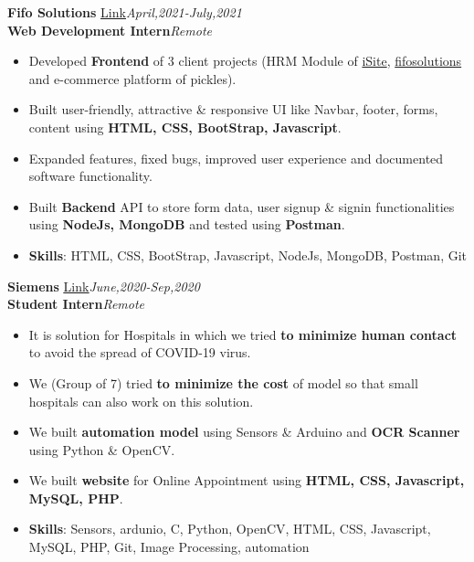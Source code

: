 \documentclass[10pt]{extarticle}
\begin{document}
\textbf{Fifo Solutions}  \href{https://github.com/PSoni8/FIFO-Solutions-Internship}{\underline{Link}}\hfill\hfill\textit{April,2021-July,2021}\\
\textbf{Web Development Intern}\hfill\hfill\textit{Remote}
    \begin{itemize}
        \item Developed \textbf{Frontend} of 3 client projects (HRM Module of \href{https://isiteinfo.com/}{iSite}, \href{https://www.fifosolutions.com/}{fifosolutions} and e-commerce platform of pickles).
        \item Built user-friendly, attractive \& responsive UI like Navbar, footer, forms, content using \textbf{HTML, CSS, BootStrap, Javascript}.
        \item Expanded features, fixed bugs, improved user experience and documented software functionality.
        \item Built \textbf{Backend} API to store form data, user signup \& signin functionalities using \textbf{NodeJs, MongoDB} and tested using \textbf{Postman}.
        \item \textbf{Skills}: HTML, CSS, BootStrap, Javascript, NodeJs, MongoDB, Postman, Git
    \end{itemize}
\vspace{5pt}
\textbf{Siemens}  \href{https://github.com/PSoni8/Automation-in-Hospital-Systems}{\underline{Link}}\hfill\hfill\textit{June,2020-Sep,2020}\\
\textbf{Student Intern}\hfill\hfill\textit{Remote}
      \begin{itemize}
          \item It is solution for Hospitals in which we tried \textbf{to minimize human contact} to avoid the spread of COVID-19 virus.
          \item We (Group of 7) tried \textbf{to minimize the cost} of model so that small hospitals can also work on this solution.
          \item We built \textbf{automation model} using Sensors \& Arduino and \textbf{OCR Scanner} using Python \& OpenCV. 
          \item We built \textbf{website} for Online Appointment using \textbf{HTML, CSS, Javascript, MySQL, PHP}.
          \item \textbf{Skills}: Sensors, ardunio, C, Python, OpenCV, HTML, CSS, Javascript, MySQL, PHP, Git, Image Processing, automation
      \end{itemize}
\vspace{2mm}
\end{document}
